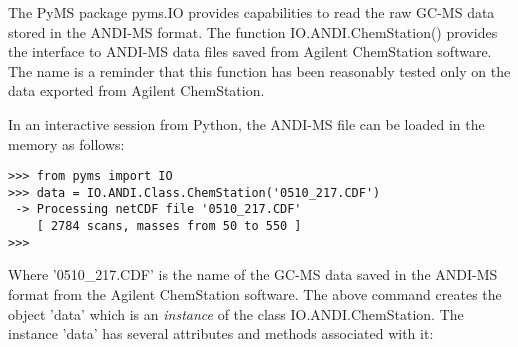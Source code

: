 The PyMS package pyms.IO provides capabilities to read the raw GC-MS
data stored in the ANDI-MS format. The function IO.ANDI.ChemStation()
provides the interface to ANDI-MS data files saved from Agilent
ChemStation software. The name is a reminder that this function has
been reasonably tested only on the data exported from Agilent ChemStation.

In an interactive session from Python, the ANDI-MS file can be loaded
in the memory as follows:

\begin{verbatim}
>>> from pyms import IO
>>> data = IO.ANDI.Class.ChemStation('0510_217.CDF')
 -> Processing netCDF file '0510_217.CDF'
    [ 2784 scans, masses from 50 to 550 ]
>>>
\end{verbatim}

Where '0510\_217.CDF' is the name of the GC-MS data saved in the ANDI-MS
format from the Agilent ChemStation software.  The above command creates
the object 'data' which is an {\em instance} of the class IO.ANDI.ChemStation.
The instance 'data' has several attributes and methods associated with it:

